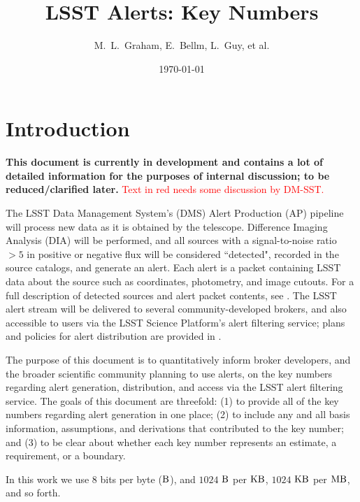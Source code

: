 \documentclass[DM,authoryear,toc]{lsstdoc}
\title[Alerts Key Numbers]{LSST Alerts: Key Numbers}
\author{%
M.~L.~Graham, E.~Bellm, L.~Guy, et al.
}
\date{\today}
\begin{document}
\maketitle

\section{Introduction} \label{sec:intro}

{\bf This document is currently in development and contains a lot of detailed information for the purposes of internal discussion; to be reduced/clarified later.} \textcolor{red}{Text in red needs some discussion by DM-SST.}

The LSST Data Management System's (DMS) Alert Production (AP) pipeline will process new data as it is obtained by the telescope. Difference Imaging Analysis (DIA) will be performed, and all sources with a signal-to-noise ratio $>5$ in positive or negative flux will be considered ``detected", recorded in the source catalogs, and generate an alert. Each alert is a packet containing LSST data about the source such as coordinates, photometry, and image cutouts. For a full description of detected sources and alert packet contents, see . The LSST alert stream will be delivered to several community-developed brokers, and also accessible to users via the LSST Science Platform's alert filtering service; plans and policies for alert distribution are provided in . 

The purpose of this document is to quantitatively inform broker developers, and the broader scientific community planning to use alerts, on the key numbers regarding alert generation, distribution, and access via the LSST alert filtering service. The goals of this document are threefold: (1) to provide all of the key numbers regarding alert generation in one place; (2) to include any and all basis information, assumptions, and derivations that contributed to the key number; and (3) to be clear about whether each key number represents an estimate, a requirement, or a boundary. 

In this work we use 8 bits per byte ($\rm B$), and $1024$ $\rm B$ per $\rm KB$, $1024$ $\rm KB$ per $\rm MB$, and so forth.
\end{document}
